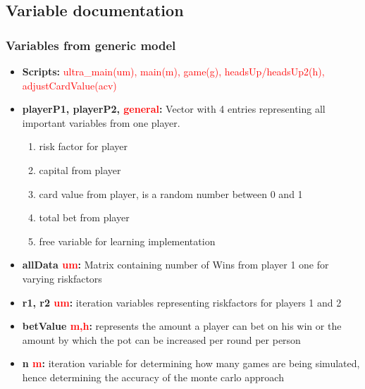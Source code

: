 \documentclass[11pt]{article}
\begin{document}
\subsection{Variable documentation}
\subsubsection{Variables from generic model}




\begin{itemize}

\item	\textbf{Scripts:} \textcolor{red}{ultra\_main(um), main(m), game(g), headsUp/headsUp2(h), adjustCardValue(acv)} \\

\item	\textbf{playerP1, playerP2, \textcolor{red}{general}:} Vector with 4 entries representing all important variables from one player.
\begin{enumerate}
	\item risk factor for player
	\item capital from player
	\item card value from player, is a random number between 0 and 1
	\item total bet from player
	\item free variable for learning implementation
\end{enumerate}		
	
	
	
	
\item	\textbf{allData \textcolor{red}{um}:}  Matrix containing number of Wins from player 1 one for varying riskfactors\\
	
\item	\textbf{r1, r2 \textcolor{red}{um}:}  iteration variables representing riskfactors for players 1 and 2\\

\item	\textbf{betValue \textcolor{red}{m,h}:} represents the amount a player can bet on his win or the amount by which the pot can be increased per round per person \\

\item	\textbf{n \textcolor{red}{m}:}  iteration variable for determining how many games are being simulated, hence determining the accuracy of the monte carlo approach\\


\end{itemize}
\end{document}
